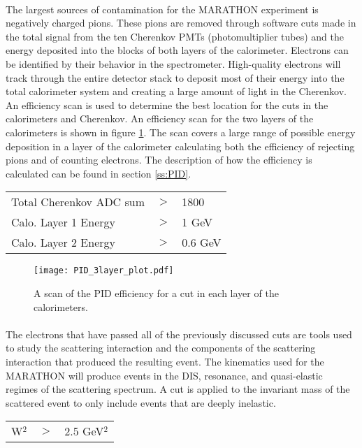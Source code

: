 \paragraph{}The largest sources of contamination for the MARATHON experiment is negatively charged pions. These pions are removed through software cuts made in the total signal from the ten Cherenkov PMTs (photomultiplier tubes) and the energy deposited into the blocks of both layers of the calorimeter. Electrons can be identified by their behavior in the spectrometer. High-quality electrons will track through the entire detector stack to deposit most of their energy into the total calorimeter system and creating a large amount of light in the Cherenkov. An efficiency scan is used to determine the best location for the cuts in the calorimeters and Cherenkov. An efficiency scan for the two layers of the calorimeters is shown in figure \ref{cal_pidscan}. The scan covers a large range of possible energy deposition in a layer of the calorimeter calculating both the efficiency of rejecting pions and of counting electrons. The description of how the efficiency is calculated can be found in section \ref{ss:PID}.

\begin{tabular}{@{$\bullet$ }lll}
	Total Cherenkov ADC sum &$>$ &1800\\
	Calo. Layer 1 Energy &$>$ & 1 GeV\\
	Calo. Layer 2 Energy &$>$ & 0.6 GeV
\end{tabular}

\begin{figure}[t]
	\centering
	\texttt{[image: PID\_3layer\_plot.pdf]}
	\caption{ A scan of the PID efficiency for a cut in each layer of the calorimeters.}
	\label{cal_pidscan}
\end{figure}

\paragraph{}The electrons that have passed all of the previously discussed cuts are tools used to study the scattering interaction and the components of the scattering interaction that produced the resulting event. The kinematics used for the MARATHON will produce events in the DIS, resonance, and quasi-elastic regimes of the scattering spectrum. A cut is applied to the invariant mass of the scattered event to only include events that are deeply inelastic. 

\begin{tabular}{@{$\bullet$ }lll}
	W$^2$ &$>$ &2.5 GeV$^2$\\
\end{tabular}

